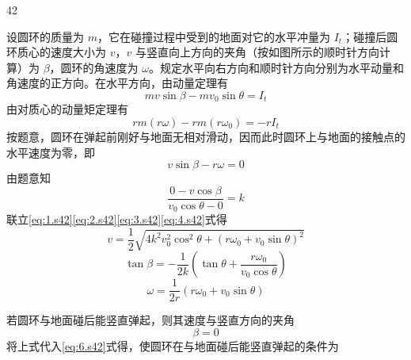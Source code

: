 \begin{solution}{42}
    \begin{subsolution}
        设圆环的质量为 $m$，它在碰撞过程中受到的地面对它的水平冲量为 $I_{t}$；碰撞后圆环质心的速度大小为 $v$，$v$ 与竖直向上方向的夹角（按如图所示的顺时针方向计算）为 $\beta$，圆环的角速度为 $\omega$。规定水平向右方向和顺时针方向分别为水平动量和角速度的正方向。在水平方向，由动量定理有
        \begin{equation}
            m v \sin\beta - m v_{0} \sin\theta = I_{t}
            \label{eq:1.s42}
        \end{equation}
        由对质心的动量矩定理有
        \begin{equation}
            r m (r\omega) - r m (r\omega_{0}) = -r I_{t}
            \label{eq:2.s42}
        \end{equation}
        按题意，圆环在弹起前刚好与地面无相对滑动，因而此时圆环上与地面的接触点的水平速度为零，即
        \begin{equation}
            v \sin\beta - r \omega = 0
            \label{eq:3.s42}
        \end{equation}
        由题意知
        \begin{equation}
            \frac{0 - v \cos\beta}{v_{0} \cos\theta - 0} = k
            \label{eq:4.s42}
        \end{equation}
        联立\eqref{eq:1.s42}\eqref{eq:2.s42}\eqref{eq:3.s42}\eqref{eq:4.s42}式得
        \begin{equation}
            v = \frac{1}{2} \sqrt{4k^{2} v_{0}^{2} \cos^{2}\theta + (r \omega_{0} + v_{0} \sin\theta)^{2}}
            \label{eq:5.s42}
        \end{equation}
        \begin{equation}
            \tan\beta = -\frac{1}{2k} \left(\tan\theta + \frac{r \omega_{0}}{v_{0} \cos\theta}\right)
            \label{eq:6.s42}
        \end{equation}
        \begin{equation}
            \omega = \frac{1}{2r} (r \omega_{0} + v_{0} \sin\theta)
            \label{eq:7.s42}
        \end{equation}
    \end{subsolution}
    \begin{subsolution}
        若圆环与地面碰后能竖直弹起，则其速度与竖直方向的夹角
        \begin{equation}
            \beta = 0
            \label{eq:8.s42}
        \end{equation}
        将上式代入\eqref{eq:6.s42}式得，使圆环在与地面碰后能竖直弹起的条件为

\end{subsolution}
\end{solution}
